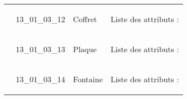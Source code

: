 \documentclass[12pt,titlepage,oneside]{book}
\begin{document}
\begin{supertabular}{|p{10cm}|c|p{13cm}|p{12cm}|}
                    & 13\_01\_03\_12 & Coffret & Liste des attributs :
\begin{enumerate}
\end{enumerate}
\\


                    & 13\_01\_03\_13 & Plaque & Liste des attributs :
\begin{enumerate}
\end{enumerate}
\\


                    & 13\_01\_03\_14 & Fontaine & Liste des attributs :
\begin{enumerate}
\end{enumerate}
\\
\hline
\end{supertabular}
\end{document}

